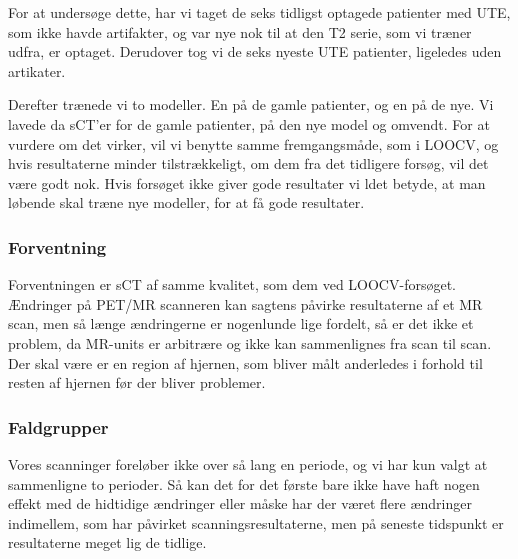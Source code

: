 For at undersøge dette, har vi taget de seks
tidligst optagede patienter med UTE, som ikke havde artifakter, og
var nye nok til at den T2 serie, som vi træner udfra, er optaget.
Derudover tog vi de seks nyeste UTE patienter, ligeledes uden artikater.

Derefter trænede vi to modeller. En på de gamle patienter, og en på de
nye. Vi lavede da sCT'er for de gamle patienter, på den nye model og
omvendt. For at vurdere om det virker, vil vi benytte samme fremgangsmåde,
som i LOOCV, og hvis resultaterne minder tilstrækkeligt, om dem fra det
tidligere forsøg, vil det være godt nok. Hvis forsøget ikke giver gode
resultater vi ldet betyde, at man løbende skal træne nye modeller, for at
få gode resultater.

\subsubsection{Forventning}

Forventningen er sCT af samme kvalitet, som dem ved LOOCV-forsøget.
Ændringer på PET/MR scanneren kan sagtens påvirke resultaterne af et MR
scan, men så længe ændringerne er nogenlunde lige fordelt, så er det ikke
et problem, da MR-units er arbitrære og ikke kan sammenlignes fra scan til
scan. Der skal være er en region af hjernen, som bliver målt anderledes i
forhold til resten af hjernen før der bliver problemer.

\subsubsection{Faldgrupper}

Vores scanninger foreløber ikke over så lang en periode, og vi har
kun valgt at sammenligne to perioder. Så kan det for det første
bare ikke have haft nogen effekt med de hidtidige ændringer eller
måske har der været flere ændringer indimellem, som har påvirket
scanningsresultaterne, men på seneste tidspunkt er resultaterne meget
lig de tidlige.

